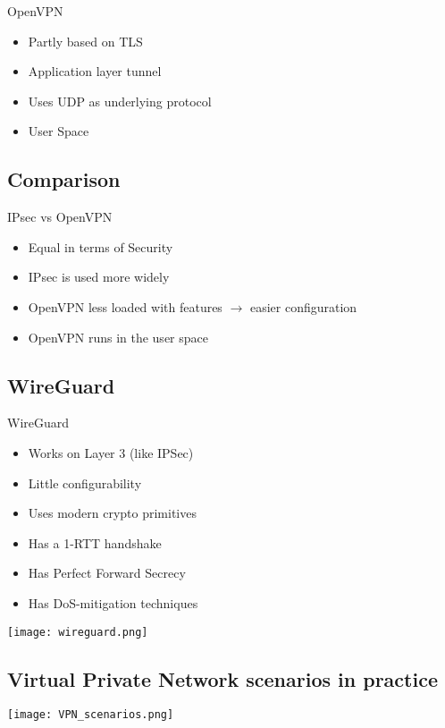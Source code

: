 \begin{definition}{OpenVPN}\\
    \begin{itemize}
        \item Partly based on TLS
        \item Application layer tunnel
        \item Uses UDP as underlying protocol
        \item User Space
    \end{itemize}
\end{definition}

\subsection{Comparison}

\begin{concept}{IPsec vs OpenVPN}\\
    \begin{itemize}
        \item Equal in terms of Security
        \item IPsec is used more widely
        \item OpenVPN less loaded with features $\rightarrow$ easier configuration
        \item OpenVPN runs in the user space
    \end{itemize}
\end{concept}

\subsection{WireGuard}

\begin{concept}{WireGuard}\\
    \begin{itemize}
        \item Works on Layer 3 (like IPSec)
        \item Little configurability
        \item Uses modern crypto primitives
        \item Has a 1-RTT handshake
        \item Has Perfect Forward Secrecy
        \item Has DoS-mitigation techniques
    \end{itemize}
\end{concept}


\texttt{[image: wireguard.png]}

\subsection{Virtual Private Network scenarios in practice}

\texttt{[image: VPN\_scenarios.png]}
